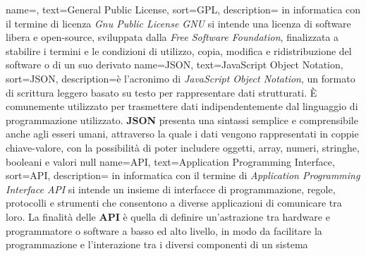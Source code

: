  {
    name=,
    text=General Public License,
    sort=GPL,
    description={ in informatica con il termine di licenza \textit{Gnu Public License GNU} si intende  
    una licenza di software libera e open-source, sviluppata dalla \textit{Free Software Foundation}, finalizzata a stabilire i termini e le condizioni 
    di utilizzo, copia, modifica e ridistribuzione del software o di un suo derivato}
}
{
    name={JSON},
    text=JavaScript Object Notation,
    sort=JSON,
    description={è l'acronimo di \textit{JavaScript Object Notation}, un formato di scrittura leggero basato su testo per rappresentare dati strutturati. 
    È comunemente utilizzato per trasmettere dati indipendentemente dal linguaggio di programmazione utilizzato. \textbf{JSON} presenta una sintassi semplice e comprensibile anche agli 
    esseri umani, attraverso la quale i dati vengono rappresentati in coppie chiave-valore, con la possibilità di poter includere 
    oggetti, array, numeri, stringhe, booleani e valori null}
}
{
    name={API},
    text=Application Programming Interface,
    sort=API,
    description={ in informatica con il termine di \textit{Application Programming Interface API} si intende un insieme di interfacce di 
    programmazione, regole, protocolli e strumenti che consentono a diverse applicazioni di comunicare tra loro. La finalità delle 
    \textbf{API} è quella di definire un'astrazione tra hardware e programmatore o software a basso ed alto livello, in modo da facilitare
    la programmazione e l'interazione tra i diversi componenti di un sistema}
}

